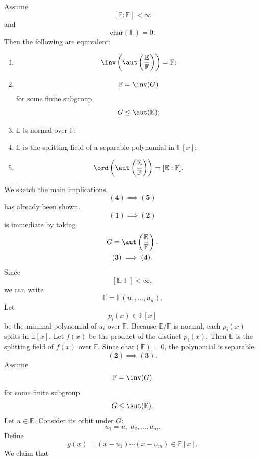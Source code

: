 \begin{theorem}{
    Assume
    \[
        [\mathbb{E}:\mathbb{F}]<\infty
    \]
    and
    \[
        \mathrm{char}(\mathbb{F})=0.
    \]
    Then the following are equivalent:
    \begin{enumerate}
        \item
        \[
            \inv\left(\aut\left(\frac{\mathbb{E}}{\mathbb{F}}\right)\right)=\mathbb{F};
        \]
        \item
        \[
            \mathbb{F}=\inv(G)
        \]
        for some finite subgroup
        \[
            G\leq \aut(\mathbb{E});
        \]
        \item $\mathbb{E}$ is normal over $\mathbb{F}$;
        \item $\mathbb{E}$ is the splitting field of a separable polynomial in $\mathbb{F}[x]$;
        \item
        \[
            \ord\left(\aut\left(\frac{\mathbb{E}}{\mathbb{F}}\right)\right)
            =
            [\mathbb{E}:\mathbb{F}].
        \]
    \end{enumerate}
}
    We sketch the main implications.
    \[
        \mathbf{(4)}\implies \mathbf{(5)}
    \]
    has already been shown.
    \[
        \mathbf{(1)}\implies \mathbf{(2)}
    \]
    is immediate by taking
    \begin{gather*}
        G=\aut\left(\frac{\mathbb{E}}{\mathbb{F}}\right).\\
        \mathbf{(3)}\implies \mathbf{(4)}.\\
    \end{gather*}
    Since
    \[
        [\mathbb{E}:\mathbb{F}]<\infty,
    \]
    we can write
    \[
        \mathbb{E}=\mathbb{F}(u_1,\ldots,u_n).
    \]
    Let
    \[
        p_i(x)\in \mathbb{F}[x]
    \]
    be the minimal polynomial of $u_i$ over $\mathbb{F}$.
    Because $\mathbb{E}/\mathbb{F}$ is normal, each $p_i(x)$ splits in $\mathbb{E}[x]$.
    Let $f(x)$ be the product of the distinct $p_i(x)$.
    Then $\mathbb{E}$ is the splitting field of $f(x)$ over $\mathbb{F}$.
    Since $\mathrm{char}(\mathbb{F})=0$, the polynomial is separable.
    \[
        \mathbf{(2)}\implies \mathbf{(3)}.
    \]
    Assume
    \[
        \mathbb{F}=\inv(G)
    \]
    for some finite subgroup
    \[
        G\leq \aut(\mathbb{E}).
    \]
    Let $u\in \mathbb{E}$.
    Consider its orbit under $G$:
    \[
        u_1=u,\ u_2,\ldots,u_m.
    \]
    Define
    \[
        g(x)=(x-u_1)\cdots(x-u_m)\in \mathbb{E}[x].
    \]
    We claim that

\end{theorem}
